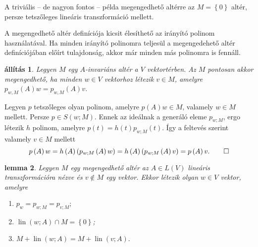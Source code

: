 \documentclass[9pt, a4paper, showtrims]{memoir}
\makeatletter
\renewenvironment{proof}[1][\proofname]
    {\par\pushQED{\qed}%
    \normalfont \topsep6\p@\@plus6\p@\relax
    \trivlist
    \item[\hskip\labelsep
        \itshape
    #1\@addpunct{:}]\ignorespaces}
    {\popQED\endtrivlist\@endpefalse}
\theoremstyle{plain}
\newtheorem{proposition}{állítás}[chapter]
\newtheorem{lemma}[proposition]{lemma}
\theoremstyle{remark}
\theoremstyle{definition}
\DeclareMathOperator{\lin}{lin}
\makeatother
\begin{document}
A triviális -- de nagyon fontos -- példa megengedhető altérre az $M=\left\{ 0 \right\}$ altér, 
persze tetszőleges lineáris transzformáció mellett.

A megengedhető altér definíciója kicsit élesíthető az irányító polinom használatával.
Ha minden irányító polinomra teljesül a megengedehető altér definíciójában előírt tulajdonság, 
akkor már minden más polinomra is fennáll.
\begin{proposition}\label{pr:megengedheto_v}
    Legyen $M$ egy $A$-invariáns altér a $V$ vektortérben.
    Az $M$ pontosan akkor megengedhető, 
    ha minden $w\in V$ vektorhoz létezik $v\in M$,
    amelyre $p_{w,M}\left( A \right)w=p_{w,M}\left( A \right)v$.
\end{proposition}
\begin{proof}
    Legyen $p$ tetszőleges olyan polinom, amelyre $p\left( A \right)w\in M$, valamely $w\in M$ mellett.
    Persze $p\in S\left( w;M \right)$.
    Ennek az ideálnak a generáló eleme $p_{w;M}$, 
    ergo létezik $h$ polinom, amelyre 
    $p\left( t \right)=h\left( t \right)p_{w;M}\left( t \right)$.
    Így a feltevés szerint valamely $v\in M$ mellett
    \begin{displaymath}
        p\left( A \right)w
        =
        h\left( A \right)\left( p_{w;M}\left( A \right)w \right)
        =
        h\left( A \right)\left( p_{w;M}\left( A \right)v \right)
        =
        p\left( A \right)v.\qedhere
    \end{displaymath}
\end{proof}
\begin{lemma}
    Legyen $M$ egy megengedhető altér az $A\in L\left( V \right)$ lineáris transzformációra nézve és $v\notin M$ egy vektor.
    Ekkor létezik olyan $w\in V$ vektor, amelyre 
    \begin{enumerate}
        \item
            \(
            p_w
            =
            p_{w;M}
            =
            p_{v;M};
            \)
        \item 
            $\lin\left( w;A \right)\cap M=\left\{ 0 \right\}$;
        \item
            \(
            M+\lin\left( w;A \right)
            =
            M+\lin\left( v;A \right).
            \)
            \qedhere
    \end{enumerate}
    \label{le:iranyito}
\end{lemma}
\end{document}
